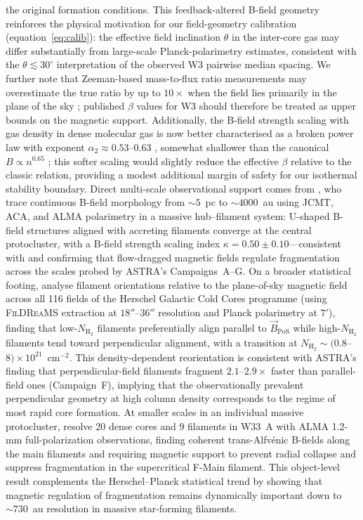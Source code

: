 \documentclass[usenatbib]{rasti}
\begin{document}
the original formation conditions.
This feedback-altered B-field geometry reinforces the physical motivation for our
field-geometry calibration (equation~\ref{eq:calib}): the effective field inclination
$\theta$ in the inter-core gas may differ substantially from large-scale Planck-polarimetry
estimates, consistent with the $\theta \lesssim 30^\circ$ interpretation of the observed
W3 pairwise median spacing.
We further note that Zeeman-based mass-to-flux ratio measurements may overestimate the
true ratio by up to $10\times$ when the field lies primarily in the plane of the sky
\citep{tritsis2025m2f}; published $\beta$ values for W3 should therefore be treated as
upper bounds on the magnetic support. Additionally, the B-field strength scaling with
gas density in dense molecular gas is now better characterised as a broken power law
with exponent $\alpha_2 \approx 0.53$--$0.63$ \citep{whitworth2026bn}, somewhat shallower
than the canonical $B \propto n^{0.65}$ \citep{crutcher2010}; this softer scaling would
slightly reduce the effective $\beta$ relative to the classic relation, providing a modest
additional margin of safety for our isothermal stability boundary.
Direct multi-scale observational support comes from \citet{wang2026multiscale}, who trace continuous B-field morphology from ${\sim}5$~pc to ${\sim}4000$~au using JCMT, ACA, and ALMA polarimetry in a massive hub--filament system: U-shaped B-field structures aligned with accreting filaments converge at the central protocluster, with a B-field strength scaling index $\kappa = 0.50 \pm 0.10$---consistent with \citet{whitworth2026bn} and confirming that flow-dragged magnetic fields regulate fragmentation across the scales probed by ASTRA's Campaigns~A--G.
On a broader statistical footing, \citet{ristorcelli2026filbfield} analyse filament orientations relative to the plane-of-sky magnetic field across all 116 fields of the Herschel Galactic Cold Cores programme (using \textsc{FilDReaMS} extraction at $18''$--$36''$ resolution and Planck polarimetry at $7'$), finding that low-$N_{\mathrm{H}_2}$ filaments preferentially align parallel to $\vec{B}_\mathrm{PoS}$ while high-$N_{\mathrm{H}_2}$ filaments tend toward perpendicular alignment, with a transition at $N_{\mathrm{H}_2} \sim (0.8$--$8) \times 10^{21}$~cm$^{-2}$. This density-dependent reorientation is consistent with ASTRA's finding that perpendicular-field filaments fragment $2.1$--$2.9\times$ faster than parallel-field ones (Campaign~F), implying that the observationally prevalent perpendicular geometry at high column density corresponds to the regime of most rapid core formation. At smaller scales in an individual massive protocluster, \citet{xu2026magmarw33a} resolve 20 dense cores and 9 filaments in W33~A with ALMA 1.2-mm full-polarization observations, finding coherent trans-Alfv\'{e}nic B-fields along the main filaments and requiring magnetic support to prevent radial collapse and suppress fragmentation in the supercritical F-Main filament. This object-level result complements the Herschel--Planck statistical trend by showing that magnetic regulation of fragmentation remains dynamically important down to $\sim730$~au resolution in massive star-forming filaments.
\end{document}

